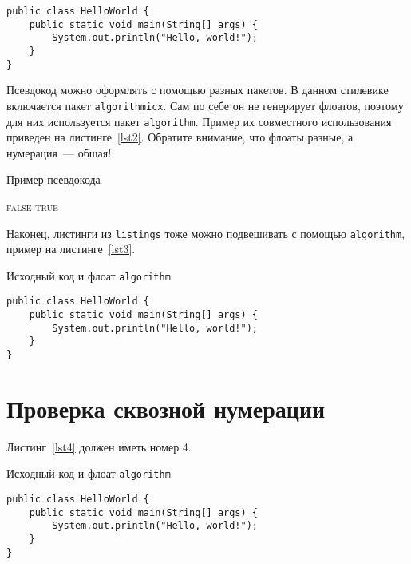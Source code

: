\documentclass[annotation,times,page4]{itmo-student-thesis}
\begin{document}
\begin{lstlisting}[float=!h,caption={Пример исходного кода на Java},label={lst1}]
public class HelloWorld {
	public static void main(String[] args) {
		System.out.println("Hello, world!");
	}
}
\end{lstlisting}

Псевдокод можно оформлять с помощью разных пакетов. В данном стилевике включается пакет \texttt{algorithmicx}.
Сам по себе он не генерирует флоатов, поэтому для них используется пакет \texttt{algorithm}.
Пример их совместного использования приведен на листинге~\ref{lst2}. Обратите внимание, что флоаты разные, а 
нумерация~--- общая!

\begin{algorithm}[!h]
\caption{Пример псевдокода}\label{lst2}
\begin{algorithmic}
				\State\Return \textsc{false}
			\EndIf
		\EndFor
		\State\Return \textsc{true}
	\EndFunction
\end{algorithmic}
\end{algorithm}

Наконец, листинги из \texttt{listings} тоже можно подвешивать с помощью \texttt{algorithm},
пример на листинге~\ref{lst3}.

\begin{algorithm}[!h]
\caption{Исходный код и флоат \texttt{algorithm}}\label{lst3}
\begin{lstlisting}
public class HelloWorld {
	public static void main(String[] args) {
		System.out.println("Hello, world!");
	}
}
\end{lstlisting}
\end{algorithm}

\chapter{Проверка сквозной нумерации}

Листинг~\ref{lst4} должен иметь номер 4.

\begin{algorithm}[!h]
\caption{Исходный код и флоат \texttt{algorithm}}\label{lst4}
\begin{lstlisting}
public class HelloWorld {
	public static void main(String[] args) {
		System.out.println("Hello, world!");
	}
}
\end{lstlisting}
\end{algorithm}
\end{document}
